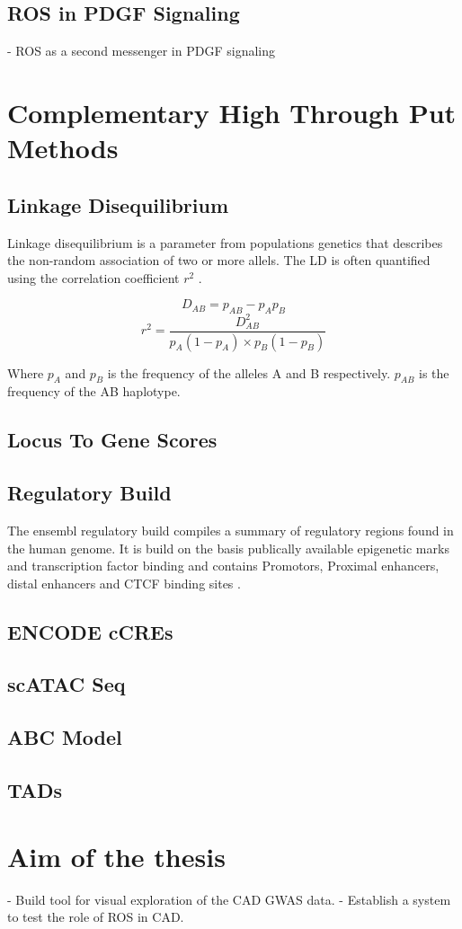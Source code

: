     \subsection{ROS in PDGF Signaling}
    \label{subsec:ROS_signaling}
    - ROS as a second messenger in PDGF signaling

\section{Complementary High Through Put Methods}
\label{sec:bioinformatics}

    \subsection{Linkage Disequilibrium}
    Linkage disequilibrium is a parameter from populations genetics that describes the non-random association of two or more allels. The LD is often quantified using the correlation coefficient $r^2$ \cite{slatkinLinkageDisequilibriumUnderstanding2008}.

    $$ D_{AB} = p_{AB} − p_A p_B $$
    $$ r^2 = \frac{D_{AB}^2}{p_A (1-p_A) \times p_B (1-p_B)} $$

    Where $p_A$ and $p_B$ is the frequency of the alleles A and B respectively. $p_{AB}$ is the frequency of the AB haplotype.

    \subsection{Locus To Gene Scores}

    \subsection{Regulatory Build}
    The ensembl regulatory build compiles a summary of regulatory regions found in the human genome. It is build on the basis publically available epigenetic marks and transcription factor binding and contains Promotors, Proximal enhancers, distal enhancers and CTCF binding sites \cite{zerbinoEnsemblRegulatoryBuild2015}.

    \subsection{ENCODE cCREs}

    \subsection{scATAC Seq}

    \subsection{ABC Model}

    \subsection{TADs}

\section{Aim of the thesis}
\label{sec:Aim}
- Build tool for visual exploration of the CAD GWAS data.
- Establish a system to test the role of ROS in CAD.
